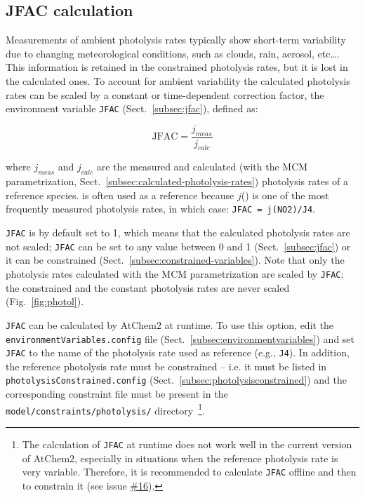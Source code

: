 \subsection{JFAC calculation} \label{subsec:jfac-calculation}

Measurements of ambient photolysis rates typically show short-term
variability due to changing meteorological conditions, such as clouds,
rain, aerosol, etc\ldots \citep{sommariva_2020}. This information is
retained in the constrained photolysis rates, but it is lost in the
calculated ones. To account for ambient variability the calculated
photolysis rates can be scaled by a constant or time-dependent
correction factor, the environment variable \texttt{JFAC}
(Sect.~\ref{subsec:jfac}), defined as:

\begin{equation}
  \mathrm{JFAC} = \frac{j_{meas}}{j_{calc}}
\end{equation}

where $j_{meas}$ and $j_{calc}$ are the measured and calculated (with
the MCM parametrization, Sect.~\ref{subsec:calculated-photolysis-rates})
photolysis rates of a reference species.  is often used as a
reference because $j$() is one of the most frequently measured
photolysis rates, in which case: \verb|JFAC = j(NO2)/J4|.

\texttt{JFAC} is by default set to 1, which means that the calculated
photolysis rates are not scaled; \texttt{JFAC} can be set to any value
between 0 and 1 (Sect.~\ref{subsec:jfac}) or it can be constrained
(Sect.~\ref{subsec:constrained-variables}). Note that only the
photolysis rates calculated with the MCM parametrization are scaled by
\texttt{JFAC}: the constrained and the constant photolysis rates are
never scaled (Fig.~\ref{fig:photol}).

\texttt{JFAC} can be calculated by AtChem2 at runtime. To use this
option, edit the \texttt{environmentVariables.config} file
(Sect.~\ref{subsec:environmentvariables}) and set \texttt{JFAC} to the
name of the photolysis rate used as reference (e.g., \texttt{J4}). In
addition, the reference photolysis rate must be constrained -- i.e.
it must be listed in \texttt{photolysisConstrained.config}
(Sect.~\ref{subsec:photolysisconstrained}) and the corresponding
constraint file must be present in the
\texttt{model/constraints/photolysis/} directory~\footnote{The
  calculation of \texttt{JFAC} at runtime does not work well in the
  current version of AtChem2, especially in situations when the
  reference photolysis rate is very variable. Therefore, it is
  recommended to calculate \texttt{JFAC} offline and then to constrain it
  (see issue \href{https://github.com/AtChem/AtChem2/issues/16}{\#16}).}.

